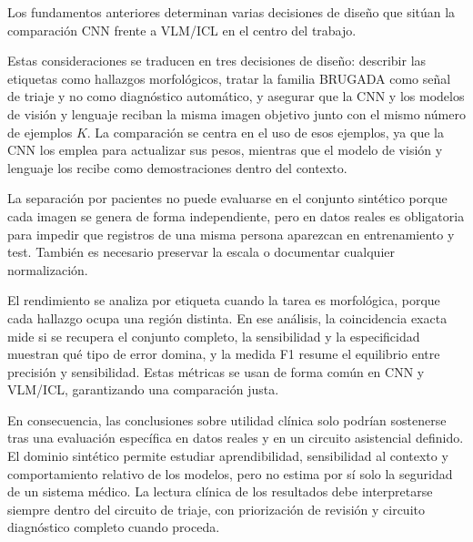 Los fundamentos anteriores determinan varias decisiones de diseño que sitúan la comparación CNN frente a VLM/ICL en el centro del trabajo.

Estas consideraciones se traducen en tres decisiones de diseño: describir las etiquetas como hallazgos morfológicos, tratar la familia BRUGADA como señal de triaje y no como diagnóstico automático, y asegurar que la CNN y los modelos de visión y lenguaje reciban la misma imagen objetivo junto con el mismo número de ejemplos \(K\). La comparación se centra en el uso de esos ejemplos, ya que la CNN los emplea para actualizar sus pesos, mientras que el modelo de visión y lenguaje los recibe como demostraciones dentro del contexto.

La separación por pacientes no puede evaluarse en el conjunto sintético porque cada imagen se genera de forma independiente, pero en datos reales es obligatoria para impedir que registros de una misma persona aparezcan en entrenamiento y test. También es necesario preservar la escala o documentar cualquier normalización.

El rendimiento se analiza por etiqueta cuando la tarea es morfológica, porque cada hallazgo ocupa una región distinta. En ese análisis, la coincidencia exacta mide si se recupera el conjunto completo, la sensibilidad y la especificidad muestran qué tipo de error domina, y la medida F1 resume el equilibrio entre precisión y sensibilidad. Estas métricas se usan de forma común en CNN y VLM/ICL, garantizando una comparación justa.

En consecuencia, las conclusiones sobre utilidad clínica solo podrían sostenerse tras una evaluación específica en datos reales y en un circuito asistencial definido. El dominio sintético permite estudiar aprendibilidad, sensibilidad al contexto y comportamiento relativo de los modelos, pero no estima por sí solo la seguridad de un sistema médico. La lectura clínica de los resultados debe interpretarse siempre dentro del circuito de triaje, con priorización de revisión y circuito diagnóstico completo cuando proceda.
